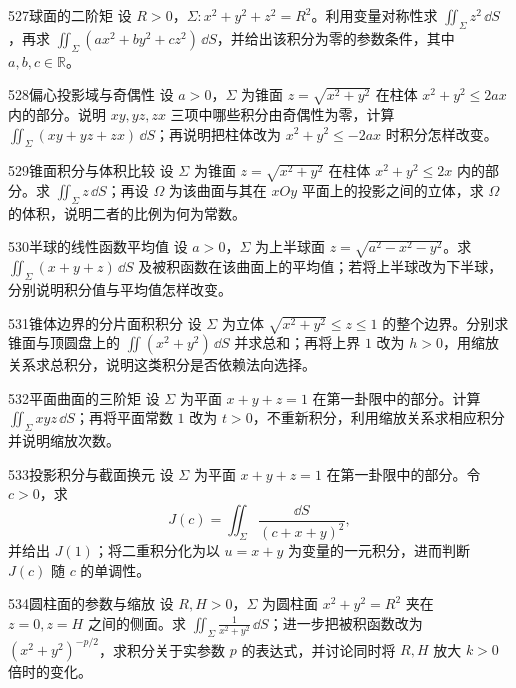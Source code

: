 \begin{exercise}{527}{球面的二阶矩}
设 $R>0$，$\Sigma:x^2+y^2+z^2=R^2$。利用变量对称性求 $\iint_{\Sigma}z^2\,\dd S$，再求 $\iint_{\Sigma}(a x^2+b y^2+c z^2)\,\dd S$，并给出该积分为零的参数条件，其中 $a,b,c\in\mathbb R$。
\end{exercise}
\begin{exercise}{528}{偏心投影域与奇偶性}
设 $a>0$，$\Sigma$ 为锥面 $z=\sqrt{x^2+y^2}$ 在柱体 $x^2+y^2\le2ax$ 内的部分。说明 $xy,yz,zx$ 三项中哪些积分由奇偶性为零，计算 $\iint_{\Sigma}(xy+yz+zx)\,\dd S$；再说明把柱体改为 $x^2+y^2\le-2ax$ 时积分怎样改变。
\end{exercise}
\begin{exercise}{529}{锥面积分与体积比较}
设 $\Sigma$ 为锥面 $z=\sqrt{x^2+y^2}$ 在柱体 $x^2+y^2\le2x$ 内的部分。求 $\iint_{\Sigma}z\,\dd S$；再设 $\Omega$ 为该曲面与其在 $xOy$ 平面上的投影之间的立体，求 $\Omega$ 的体积，说明二者的比例为何为常数。
\end{exercise}
\begin{exercise}{530}{半球的线性函数平均值}
设 $a>0$，$\Sigma$ 为上半球面 $z=\sqrt{a^2-x^2-y^2}$。求 $\iint_{\Sigma}(x+y+z)\,\dd S$ 及被积函数在该曲面上的平均值；若将上半球改为下半球，分别说明积分值与平均值怎样改变。
\end{exercise}
\begin{exercise}{531}{锥体边界的分片面积积分}
设 $\Sigma$ 为立体 $\sqrt{x^2+y^2}\le z\le1$ 的整个边界。分别求锥面与顶圆盘上的 $\iint(x^2+y^2)\,\dd S$ 并求总和；再将上界 $1$ 改为 $h>0$，用缩放关系求总积分，说明这类积分是否依赖法向选择。
\end{exercise}
\begin{exercise}{532}{平面曲面的三阶矩}
设 $\Sigma$ 为平面 $x+y+z=1$ 在第一卦限中的部分。计算 $\iint_{\Sigma}xyz\,\dd S$；再将平面常数 $1$ 改为 $t>0$，不重新积分，利用缩放关系求相应积分并说明缩放次数。
\end{exercise}
\begin{exercise}{533}{投影积分与截面换元}
设 $\Sigma$ 为平面 $x+y+z=1$ 在第一卦限中的部分。令 $c>0$，求
\[J(c)=\iint_{\Sigma}\frac{\dd S}{(c+x+y)^2},\]
并给出 $J(1)$；将二重积分化为以 $u=x+y$ 为变量的一元积分，进而判断 $J(c)$ 随 $c$ 的单调性。
\end{exercise}
\begin{exercise}{534}{圆柱面的参数与缩放}
设 $R,H>0$，$\Sigma$ 为圆柱面 $x^2+y^2=R^2$ 夹在 $z=0,z=H$ 之间的侧面。求 $\iint_{\Sigma}\frac1{x^2+y^2}\,\dd S$；进一步把被积函数改为 $(x^2+y^2)^{-p/2}$，求积分关于实参数 $p$ 的表达式，并讨论同时将 $R,H$ 放大 $k>0$ 倍时的变化。
\end{exercise}
